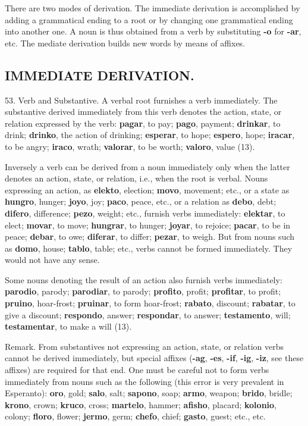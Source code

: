 There are two modes of derivation. The immediate derivation is accomplished by adding a grammatical ending to a root or by changing one grammatical ending into another one. A noun is thus obtained from a verb by substituting \textbf{-o} for \textbf{-ar}, etc. The mediate derivation builds new words by means of affixes.

\subsection*{IMMEDIATE DERIVATION.}
53. Verb and Substantive. A verbal root furnishes a verb immediately. The substantive derived immediately from this verb denotes the action, state, or relation expressed by the verb: \textbf{pagar}, to pay; \textbf{pago}, payment; \textbf{drinkar}, to drink; \textbf{drinko}, the action of drinking; \textbf{esperar}, to hope; \textbf{espero}, hope; \textbf{iracar}, to be angry; \textbf{iraco}, wrath; \textbf{valorar}, to be worth; \textbf{valoro}, value (13). 

Inversely a verb can be derived from a noun immediately only when the latter denotes an action, state, or relation, i.e., when the root is verbal. Nouns expressing an action, as \textbf{elekto}, election; \textbf{movo}, movement; etc., or a state as \textbf{hungro}, hunger; \textbf{joyo}, joy; \textbf{paco}, peace, etc., or a relation as \textbf{debo}, debt; \textbf{difero}, difference; \textbf{pezo}, weight; etc., furnish verbs immediately: \textbf{elektar}, to elect; \textbf{movar}, to move; \textbf{hungrar}, to hunger; \textbf{joyar}, to rejoice; \textbf{pacar}, to be in peace; \textbf{debar}, to owe; \textbf{diferar}, to differ; \textbf{pezar}, to weigh. But from nouns such as \textbf{domo}, house; \textbf{tablo}, table; etc., verbs cannot be formed immediately. They would not have any sense. 

Some nouns denoting the result of an action also furnish verbs immediately: \textbf{parodio}, parody; \textbf{parodiar}, to parody; \textbf{profito}, profit; \textbf{profitar}, to profit; \textbf{pruino}, hoar-frost; \textbf{pruinar}, to form hoar-frost; \textbf{rabato}, discount; \textbf{rabatar}, to give a discount; \textbf{respondo}, answer; \textbf{respondar}, to answer; \textbf{testamento}, will; \textbf{testamentar}, to make a will (13). 

\small Remark. From substantives not expressing an action, state, or relation verbs cannot be derived immediately, but special affixes (\textbf{-ag}, \textbf{-es}, \textbf{-if}, \textbf{-ig}, \textbf{-iz}, see these affixes) are required for that end. One must be careful not to form verbs immediately from nouns such as the following (this error is very prevalent in Esperanto): \textbf{oro}, gold; \textbf{salo}, salt; \textbf{sapono}, soap; \textbf{armo}, weapon; \textbf{brido}, bridle; \textbf{krono}, crown; \textbf{kruco}, cross; \textbf{martelo}, hammer; \textbf{afisho}, placard; \textbf{kolonio}, colony; \textbf{floro}, flower; \textbf{jermo}, germ; \textbf{chefo}, chief; \textbf{gasto}, guest; etc., etc. \normalsize

